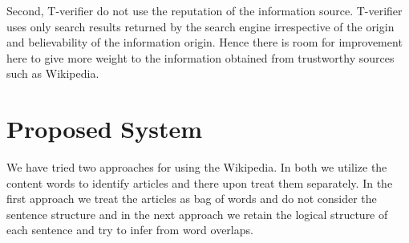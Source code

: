 \documentclass[11pt]{article}
\begin{document}
Second, T-verifier do not use the reputation of the information source.
T-verifier uses only search results returned by the search engine irrespective of
the origin and believability of the information origin. Hence there is room for
improvement here to give more weight to the information obtained from trustworthy
sources such as Wikipedia.


\section{Proposed System}
\label{sec:UseOfWikipedia}
We have tried two approaches for using the Wikipedia. In both we utilize the content words to identify articles and there upon treat them separately. In the first approach we treat the articles as bag of words and do not consider the sentence structure and in the next approach we retain the logical structure of each sentence and try to infer from word overlaps.
 

\label{Mar29toApr12}
\end{document}
